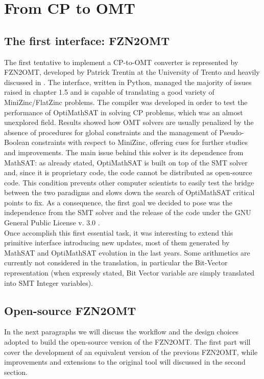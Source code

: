 \chapter{From CP to OMT}
\label{cha:OMTcore}

\section{The first interface: FZN2OMT}

The first tentative to implement a CP-to-OMT converter is represented by FZN2OMT, developed by Patrick Trentin at the University of Trento and heavily discussed in \cite{cp2omt}. The interface, written in Python, managed the majority of issues raised in chapter 1.5 and is capable of translating a good variety of MiniZinc/FlatZinc problems. The compiler was developed in order to test the performance of OptiMathSAT in solving CP problems, which was an almost unexplored field. Results showed how OMT solvers are usually penalized by the absence of procedures for global constraints and the management of Pseudo-Boolean constraints with respect to MiniZinc, offering cues for further studies and improvements. The main issue behind this solver is its dependence from MathSAT: as already stated, OptiMathSAT is built on top of the SMT solver and, since it is proprietary code, the code cannot be distributed as open-source code. This condition prevents other computer scientists to easily test the bridge between the two paradigms and slows down the search of OptiMathSAT critical points to fix. As a consequence, the first goal we decided to pose was the independence from the SMT solver and the release of the code under the GNU General Public License v. 3.0 \cite{GPL}. \\
Once accomplish this first essential task, it was interesting to extend this primitive interface introducing new updates, most of them generated by MathSAT and OptiMathSAT evolution in the last years. Some arithmetics are currently not considered in the translation, in particular the Bit-Vector representation (when expressly stated, Bit Vector variable are simply translated into SMT Integer variables). 

\section{Open-source FZN2OMT}

In the next paragraphs we will discuss the workflow and the design choices adopted to build the open-source version of the FZN2OMT. The first part will cover the development of an equivalent version of the previous FZN2OMT, while improvements and extensions to the original tool will discussed in the second section.

